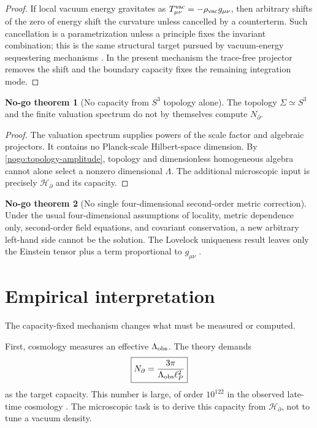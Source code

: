 \documentclass[aps,prd,reprint,nofootinbib,superscriptaddress,floatfix]{revtex4-2}
\numberwithin{equation}{section}
\theoremstyle{definition}
\newtheorem{nogotheorem}{No-go theorem}[section]
\theoremstyle{plain}
\newcommand{\Ncap}{N_{\partial}}
\begin{document}
\begin{proof}
If local vacuum energy gravitates as \(T^{\rm vac}_{\mu\nu}=-\rho_{\rm vac}g_{\mu\nu}\), then arbitrary shifts of the zero of energy shift the curvature unless cancelled by a counterterm.  Such cancellation is a parametrization unless a principle fixes the invariant combination; this is the same structural target pursued by vacuum-energy sequestering mechanisms \cite{KaloperPadilla2014}.  In the present mechanism the trace-free projector removes the shift and the boundary capacity fixes the remaining integration mode.
\end{proof}

\begin{nogotheorem}[No capacity from \(S^3\) topology alone]\label{nogo:no-topology-capacity}
The topology \(\Sigma\simeq S^3\) and the finite valuation spectrum do not by themselves compute \(\Ncap\).
\end{nogotheorem}

\begin{proof}
The valuation spectrum supplies powers of the scale factor and algebraic projectors.  It contains no Planck-scale Hilbert-space dimension.  By \cref{nogo:topology-amplitude}, topology and dimensionless homogeneous algebra cannot alone select a nonzero dimensional \(\Lambda\).  The additional microscopic input is precisely \(\mathcal H_\partial\) and its capacity.
\end{proof}

\begin{nogotheorem}[No single four-dimensional second-order metric correction]\label{nogo:lovelock}
Under the usual four-dimensional assumptions of locality, metric dependence only, second-order field equations, and covariant conservation, a new arbitrary left-hand side cannot be the solution.  The Lovelock uniqueness result leaves only the Einstein tensor plus a term proportional to \(g_{\mu\nu}\) \cite{Lovelock1971,Curiel2016,PadmanabhanKothawala2013}.
\end{nogotheorem}

\section{Empirical interpretation}

The capacity-fixed mechanism changes what must be measured or computed.

First, cosmology measures an effective \(\Lambda_{\rm obs}\).  The theory demands
\begin{equation}
\boxed{
\Ncap
=
\frac{3\pi}{\Lambda_{\rm obs}\ell_P^2}
}
\end{equation}
as the target capacity.  This number is large, of order \(10^{122}\) in the observed late-time cosmology \cite{Planck2018}.  The microscopic task is to derive this capacity from \(\mathcal H_\partial\), not to tune a vacuum density.
\end{document}
